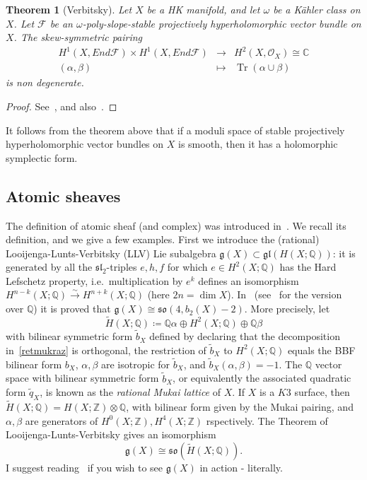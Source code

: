 \documentclass[11pt]{amsart}
\newcommand{\CC}{{\mathbb C}}
\newcommand{\QQ}{{\mathbb Q}}
\newcommand{\ZZ}{{\mathbb Z}}
\let\mathcal\mathscr
\def\cF{\mathcal{F}}
\def\cO{\mathcal{O}}
\def\gotg{\mathfrak g}
\def\gotl{\mathfrak l}
\def\goto{\mathfrak o}
\def\gots{\mathfrak s}
\DeclareMathOperator{\Tr}{Tr}
\newcommand{\wt}{\widetilde}
\def\lra{\longrightarrow}
\newtheorem{thm}[lmm]{Theorem}
\theoremstyle{definition}
\theoremstyle{remark}
\begin{document}
%
\begin{thm}[Verbitsky]
%
Let $X$ be a HK manifold, and let $\omega$ be a K\"ahler class on $X$. 
Let $\cF$ be an $\omega$-poly-slope-stable projectively hyperholomorphic vector bundle  on $X$. The skew-symmetric pairing
%
\begin{equation}
%
\begin{matrix}
%
H^1(X,End\cF)\times H^1(X,End\cF) & \lra & H^2(X,\cO_X)\cong\CC \\
%
(\alpha,\beta) & \mapsto & \Tr(\alpha\cup\beta)
%
\end{matrix}
%
\end{equation}
%
is non degenerate.
%
\end{thm}
%
%
\begin{proof}
%
See~\cite[Sect.~9]{verb:iperolom}, and also~\cite[Sect.~7]{bottini:og10asmodspace}.
%
\end{proof}
%
It follows from the theorem above that if a moduli space of stable projectively hyperholomorphic vector bundles  on $X$ is smooth, then it has a holomorphic symplectic form.


%
\subsection{Atomic sheaves}\label{subsec:democrito}
%
%
\setcounter{equation}{0}
%
The definition of atomic sheaf (and complex) was introduced in~\cite{beckmann:atomic,markman:rank1obs}. We recall its definition, and we give a few examples. 
First we introduce the (rational) Looijenga-Lunts-Verbitsky (LLV) Lie subalgebra $\gotg(X)\subset \gotg\gotl(H(X;\QQ))$: it is generated by all the 
$\gots\gotl_2$-triples $e,h,f$ for which $e\in H^2(X;\QQ)$ has the Hard Lefschetz property, i.e.~multiplication by $e^k$ defines an isomorphism
$H^{n-k}(X;\QQ)\xrightarrow{\sim} H^{n+k}(X;\QQ)$ (here $2n=\dim X$). In~\cite{looijlunts:LLV,verbcohk} (see~\cite{soldato:hodgehk} for the version over $\QQ$) it is proved that $\gotg(X)\cong\gots\goto(4,b_2(X)-2)$. More precisely, let 
%
\begin{equation}\label{retmukraz}
%
\wt{H}(X;\QQ)\coloneqq \QQ\alpha\oplus H^2(X;\QQ)\oplus \QQ\beta
%
\end{equation}
%
with bilinear symmetric form $\wt{b}_X$ defined  by declaring that the decomposition in~\eqref{retmukraz} is orthogonal,  the restriction of 
$\wt{b}_X$ to $H^2(X;\QQ)$ equals the BBF bilinear form $b_X$, $\alpha,\beta$ are isotropic for $\wt{b}_X$, and $\wt{b}_X(\alpha,\beta)=-1$. 
The $\QQ$ vector space with bilinear symmetric form $\wt{b}_X$, or equivalently the associated quadratic form 
$\wt{q}_X$, is known as the \emph{rational Mukai lattice} of $X$.
If $X$ is a $K3$ surface, then $\wt{H}(X;\QQ)=H(X;\ZZ)\otimes\QQ$,  with bilinear form given by the Mukai pairing, and $\alpha,\beta$ are generators of $H^0(X;\ZZ),H^4(X;\ZZ)$ rspectively. The Theorem of Looijenga-Lunts-Verbitsky gives an  isomorphism
%
\begin{equation}\label{elle2vu}
%
\gotg(X)\cong \gots\goto(\wt{H}(X;\QQ)).
%
\end{equation}
%
I suggest reading~\cite{gklr:algebrallv} if you wish to see $\gotg(X)$ in action - literally.
\end{document}
